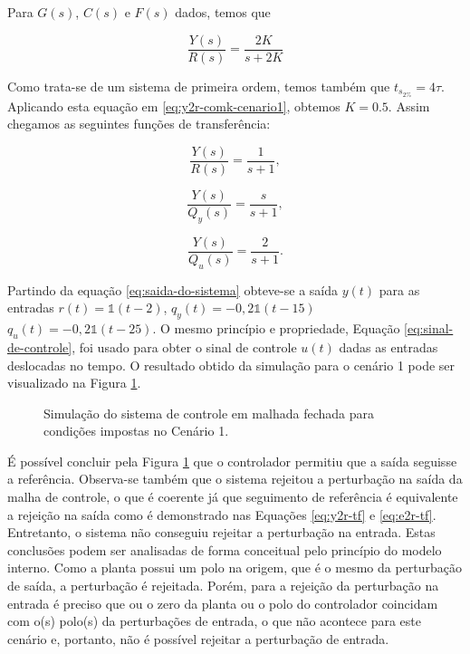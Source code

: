 Para $G(s)$, $C(s)$ e $F(s)$ dados, temos que

\begin{equation}
    \label{eq:y2r-comk-cenario1}
    \frac{Y(s)}{R(s)} = \frac{2K}{s + 2K}
\end{equation}

Como trata-se de um sistema de primeira ordem, temos também que $t_{s_{2\%}} =
4\tau$. Aplicando esta equação em \ref{eq:y2r-comk-cenario1}, obtemos $K = 0.5$.
Assim chegamos as seguintes funções de transferência:

\begin{equation}
    \label{eq:y2r-cenario1}
    \frac{Y(s)}{R(s)} = \frac{1}{s + 1},
\end{equation}

\begin{equation}
    \label{eq:y2qy-cenario1}
    \frac{Y(s)}{Q_{y}(s)} = \frac{s}{s + 1},
\end{equation}

\begin{equation}
    \label{eq:y2qu-cenario1}
    \frac{Y(s)}{Q_{u}(s)} = \frac{2}{s + 1}.
\end{equation}

Partindo da equação \ref{eq:saida-do-sistema} obteve-se a saída $y(t)$ para as
entradas $r(t) = \mathds{1}(t - 2)$, $q_{y}(t) = -0,2\mathds{1}(t - 15)$
$q_{u}(t) = -0,2\mathds{1}(t - 25)$. O mesmo princípio e propriedade, Equação
\ref{eq:sinal-de-controle}, foi usado para obter o sinal de controle $u(t)$
dadas as entradas deslocadas no tempo. O resultado obtido da simulação para o
cenário 1 pode ser visualizado na Figura \ref{fig:resultado-desafio1-cenario1}.

\begin{figure}[!ht]
    \caption{Simulação do sistema de controle em malhada fechada para condições
    impostas no Cenário 1.}
    \vspace{-10pt}
    \hspace{-30pt}
    \label{fig:resultado-desafio1-cenario1}
    \begin{minipage}{\linewidth}
        
    \end{minipage}
\end{figure}

É possível concluir pela Figura \ref{fig:resultado-desafio1-cenario1} que o
controlador permitiu que a saída seguisse a referência. Observa-se também que o
sistema rejeitou a perturbação na saída da malha de controle, o que é coerente
já que seguimento de referência é equivalente a rejeição na saída como é
demonstrado nas Equações \ref{eq:y2r-tf} e \ref{eq:e2r-tf}. Entretanto, o
sistema não conseguiu rejeitar a perturbação na entrada. Estas conclusões
podem ser analisadas de forma conceitual pelo princípio do modelo interno. Como
a planta possui um polo na origem, que é o mesmo da perturbação de saída, a
perturbação é rejeitada. Porém, para a rejeição da perturbação na entrada é
preciso que ou o zero da planta ou o polo do controlador coincidam com o(s)
polo(s) da perturbações de entrada, o que não acontece para este cenário e,
portanto, não é possível rejeitar a perturbação de entrada.

